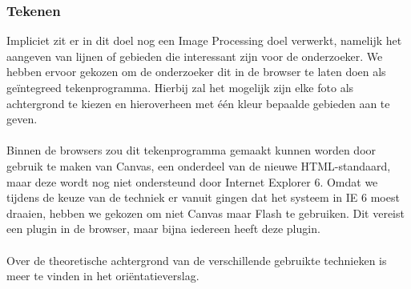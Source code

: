 \subsubsection{Tekenen}
Impliciet zit er in dit doel nog een Image Processing doel verwerkt, namelijk het aangeven van lijnen of gebieden die interessant zijn voor de onderzoeker. We hebben ervoor gekozen om de onderzoeker dit in de browser te laten doen als ge\"{i}ntegreed tekenprogramma. Hierbij zal het mogelijk zijn elke foto als achtergrond te kiezen en hieroverheen met \'{e}\'{e}n kleur bepaalde gebieden aan te geven.
\\
\\
Binnen de browsers zou dit tekenprogramma gemaakt kunnen worden door gebruik te maken van Canvas, een onderdeel van de nieuwe HTML-standaard, maar deze wordt nog niet ondersteund door Internet Explorer 6. Omdat we tijdens de keuze van de techniek er vanuit gingen dat het systeem in IE 6 moest draaien, hebben we gekozen om niet Canvas maar Flash te gebruiken. Dit vereist een plugin in de browser, maar bijna iedereen heeft deze plugin.
\\
\\
Over de theoretische achtergrond van de verschillende gebruikte technieken is meer te vinden in het ori\"{e}ntatieverslag.
